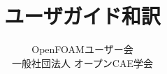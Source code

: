 \documentclass{OFbook}
\title{ユーザガイド和訳}
\author{OpenFOAMユーザー会\\
        一般社団法人 オープンCAE学会}
\begin{document}
\maketitle
\frontmatter

\begin{OFdeclaration}



\end{OFdeclaration}

\tableofcontents

\mainmatter








\backmatter
\printindex
\end{document}
